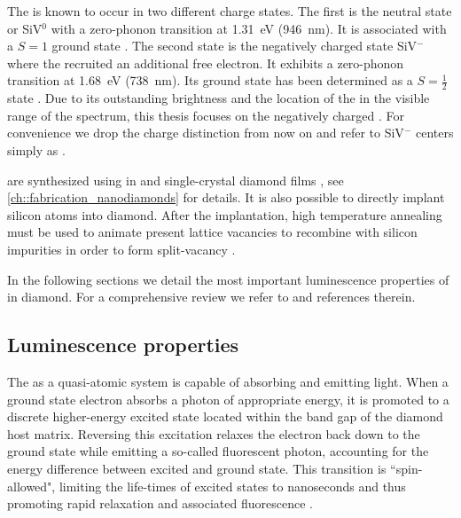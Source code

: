   The \siv is known to occur in two different charge states. The first is the neutral state or SiV$^0$ with a zero-phonon transition at \SI{1.31}{\eV} (\SI{946}{\nm}). It is associated with a $S = 1$ ground state \cite{DHaenens-Johansson2011}. The second state is the negatively charged state SiV$^{-}$ where the \sivc recruited an additional free electron. It exhibits a zero-phonon transition at \SI{1.68}{\eV} (\SI{738}{\nm}). Its ground state has been determined as a $S = \frac{1}{2}$ state \cite{Goss2007, Hepp2014}. Due to its outstanding brightness and the location of the \zpl in the visible range of the spectrum, this thesis focuses on the negatively charged \siv. For convenience we drop the charge distinction from now on and refer to SiV$^{-}$ centers simply as \sivs.

  \sivs are synthesized using \CVD in \nds and single-crystal diamond films \cite{Neu2011b}, see \autoref{ch::fabrication_nanodiamonds} for details. It is also possible to directly implant silicon atoms into diamond. After the implantation, high temperature annealing must be used to animate present lattice vacancies to recombine with silicon impurities in order to form split-vacancy \sivs \cite{Collins1983,Hepp2014}.

  In the following sections we detail the most important luminescence properties of \sivs in diamond. For a comprehensive review we refer to \cite{Riedrich-moller2014, neu2012} and references therein.


  \subsection{Luminescence properties}

    The \sivc as a quasi-atomic system is capable of absorbing and emitting light. When a ground state electron absorbs a photon of appropriate energy, it is promoted to a discrete higher-energy excited state located within the band gap of the diamond host matrix. Reversing this excitation relaxes the electron back down to the ground state while emitting a so-called fluorescent photon, accounting for the energy difference between excited and ground state. This transition is ``spin-allowed", limiting the life-times of excited states to nanoseconds and thus promoting rapid relaxation and associated fluorescence \cite{Gali2013b}.

